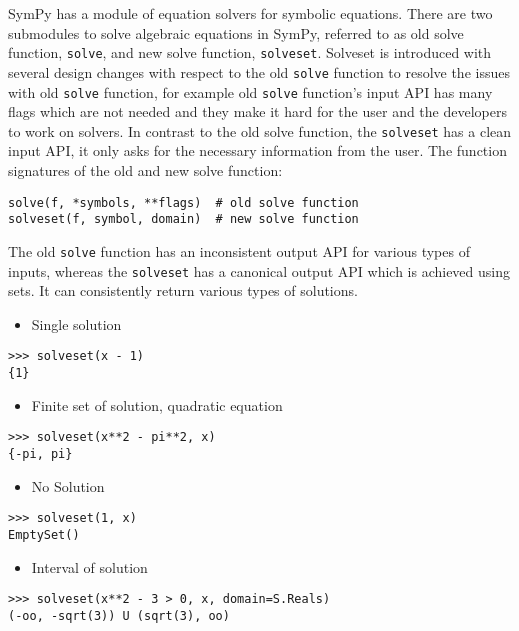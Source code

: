 

SymPy has a module of equation solvers for symbolic equations. There are two
submodules to solve algebraic equations in SymPy, referred to as old solve
function, \texttt{solve}, and new solve function, \texttt{solveset}.
Solveset is introduced with several design changes with respect to the old
\texttt{solve} function to resolve the issues with old \texttt{solve} function,
for example old \texttt{solve} function's input API has many flags which are
not needed and they make it hard for the user and the developers to work on
solvers. In contrast to the old solve function, the \texttt{solveset} has a
clean input API, it only asks for the necessary information from the user.
The function signatures of the old and new solve function:
\begin{verbatim}
solve(f, *symbols, **flags)  # old solve function
solveset(f, symbol, domain)  # new solve function
\end{verbatim}
The old \texttt{solve} function has an inconsistent output API for various types
of inputs, whereas the \texttt{solveset} has a canonical output API which is
achieved using sets. It can consistently return various types of solutions.

\begin{itemize}
\item Single solution
\end{itemize}
\begin{verbatim}
>>> solveset(x - 1)
{1}
\end{verbatim}

\begin{itemize}
\item Finite set of solution, quadratic equation
\end{itemize}
\begin{verbatim}
>>> solveset(x**2 - pi**2, x)
{-pi, pi}
\end{verbatim}

\begin{itemize}
\item No Solution
\end{itemize}
\begin{verbatim}
>>> solveset(1, x)
EmptySet()
\end{verbatim}

\begin{itemize}
\item Interval of solution
\end{itemize}
\begin{verbatim}
>>> solveset(x**2 - 3 > 0, x, domain=S.Reals)
(-oo, -sqrt(3)) U (sqrt(3), oo)
\end{verbatim}

